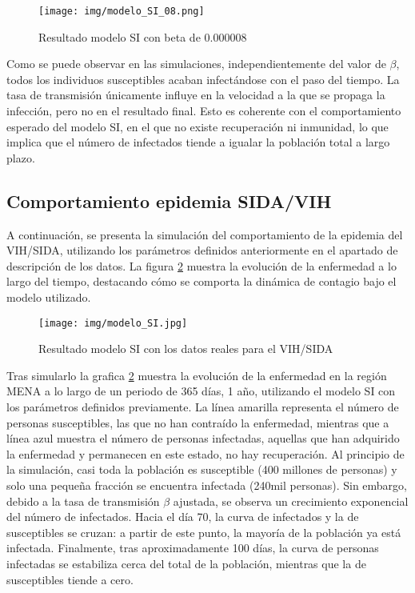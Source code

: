 \begin{figure}[H]
    \centering
    \texttt{[image: img/modelo\_SI\_08.png]}
    \caption{Resultado modelo SI con beta de 0.000008}
    \label{fig:simulacion 3 SI}
    \vspace{0.5cm} %
\end{figure}

Como se puede observar en las simulaciones, independientemente del valor de $\beta$, todos los individuos susceptibles acaban infectándose con el paso del tiempo. La tasa de transmisión únicamente influye en la velocidad a la que se propaga la infección, pero no en el resultado final. Esto es coherente con el comportamiento esperado del modelo SI, en el que no existe recuperación ni inmunidad, lo que implica que el número de infectados tiende a igualar la población total a largo plazo.


\subsection{Comportamiento epidemia SIDA/VIH}
A continuación, se presenta la simulación del comportamiento de la epidemia del VIH/SIDA, utilizando los parámetros definidos anteriormente en el apartado de descripción de los datos. La figura \ref{fig:vih} muestra la evolución de la enfermedad a lo largo del tiempo, destacando cómo se comporta la dinámica de contagio bajo el modelo utilizado.

\begin{figure}[H]
    \centering
    \texttt{[image: img/modelo\_SI.jpg]}
    \caption{Resultado modelo SI con los datos reales para el VIH/SIDA}
    \label{fig:vih}
    \vspace{0.5cm} %
\end{figure}

Tras simularlo la grafica \ref{fig:vih} muestra la evolución de la enfermedad en la región MENA a lo largo de un periodo de 365 días, 1 año, utilizando el modelo SI con los parámetros definidos previamente.
La línea amarilla representa el número de personas susceptibles, las que no han contraído la enfermedad, mientras que a línea azul muestra el número de personas infectadas, aquellas que han adquirido la enfermedad y permanecen en este estado, no hay recuperación.
Al principio de la simulación, casi toda la población es susceptible (400 millones de personas) y solo una pequeña fracción se encuentra infectada (240mil personas). Sin embargo, debido a la tasa de transmisión $\beta$ ajustada, se observa un crecimiento exponencial del número de infectados.
Hacia el día 70, la curva de infectados y la de susceptibles se cruzan: a partir de este punto, la mayoría de la población ya está infectada. Finalmente, tras aproximadamente 100 días, la curva de personas infectadas se estabiliza cerca del total de la población, mientras que la de susceptibles tiende a cero.



